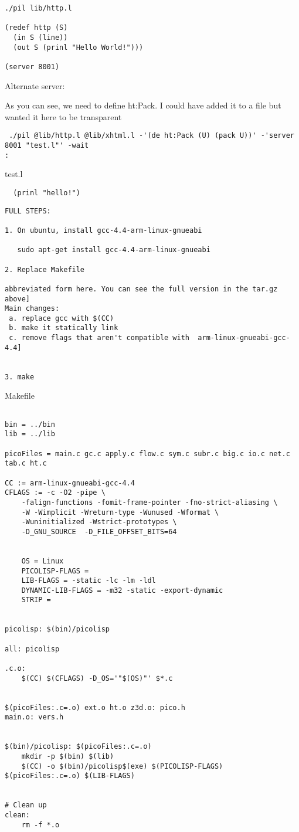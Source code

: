 \documentclass[10pt,a4paper]{article}
\begin{document}
\begin{verbatim}
./pil lib/http.l

(redef http (S)
  (in S (line))
  (out S (prinl "Hello World!")))

(server 8001)

\end{verbatim}


Alternate server:

As you can see, we need to define ht:Pack. I could have added it to a file but wanted it here to be transparent

\begin{verbatim}
 ./pil @lib/http.l @lib/xhtml.l -'(de ht:Pack (U) (pack U))' -'server 8001 "test.l"' -wait
:\end{verbatim}


test.l
\begin{verbatim}
  (prinl "hello!")
\end{verbatim}



\begin{verbatim}
FULL STEPS:

1. On ubuntu, install gcc-4.4-arm-linux-gnueabi

   sudo apt-get install gcc-4.4-arm-linux-gnueabi

2. Replace Makefile

abbreviated form here. You can see the full version in the tar.gz above]
Main changes:
 a. replace gcc with $(CC)
 b. make it statically link
 c. remove flags that aren't compatible with  arm-linux-gnueabi-gcc-4.4]


3. make

\end{verbatim}


Makefile
\begin{verbatim}

bin = ../bin
lib = ../lib

picoFiles = main.c gc.c apply.c flow.c sym.c subr.c big.c io.c net.c tab.c ht.c

CC := arm-linux-gnueabi-gcc-4.4
CFLAGS := -c -O2 -pipe \
	-falign-functions -fomit-frame-pointer -fno-strict-aliasing \
	-W -Wimplicit -Wreturn-type -Wunused -Wformat \
	-Wuninitialized -Wstrict-prototypes \
	-D_GNU_SOURCE  -D_FILE_OFFSET_BITS=64


	OS = Linux
	PICOLISP-FLAGS =
	LIB-FLAGS = -static -lc -lm -ldl
	DYNAMIC-LIB-FLAGS = -m32 -static -export-dynamic
	STRIP =


picolisp: $(bin)/picolisp

all: picolisp

.c.o:
	$(CC) $(CFLAGS) -D_OS='"$(OS)"' $*.c


$(picoFiles:.c=.o) ext.o ht.o z3d.o: pico.h
main.o: vers.h


$(bin)/picolisp: $(picoFiles:.c=.o)
	mkdir -p $(bin) $(lib)
	$(CC) -o $(bin)/picolisp$(exe) $(PICOLISP-FLAGS) $(picoFiles:.c=.o) $(LIB-FLAGS)


# Clean up
clean:
	rm -f *.o

\end{verbatim}
\end{document}
